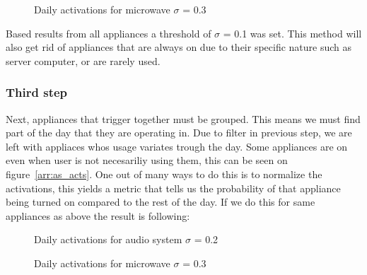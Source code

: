 \begin{figure}[H]
    \centering
    \caption{Daily activations for microwave $\sigma$ = 0.3}
    \label{arr:microwave_acts}
\end{figure}

Based results from all appliances a threshold of $\sigma$ = 0.1 was set.
This method will also get rid of appliances that are always on due to their specific nature such as server computer, 
or are rarely used. 

\subsubsection{Third step}

Next, appliances that trigger together must be grouped. 
This means we must find part of the day that they are operating in.
Due to filter in previous step, we are left with appliaces whos usage variates trough the day. 
Some appliances are on even when user is not necesariliy using them, this can be seen on figure \ref{arr:as_acts}.
One out of many ways to do this is to normalize the activations, this yields a metric that tells us the probability of that appliance being turned on compared to the rest of the day. 
If we do this for same appliances as above the result is following: 

\begin{figure}[H]
    \centering
    \caption{Daily activations for audio system $\sigma$ = 0.2}
    \label{arr:as_acts_norm}
\end{figure}

\begin{figure}[H]
    \centering
    \caption{Daily activations for microwave $\sigma$ = 0.3}
    \label{arr:microwave_acts_norm}
\end{figure}

